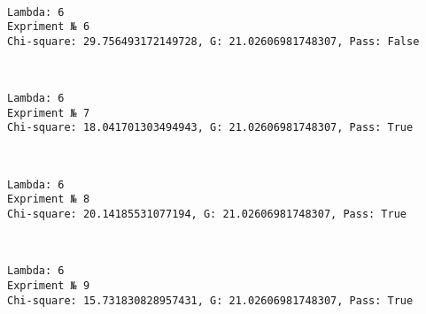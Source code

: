 \documentclass[11pt]{article}
\begin{document}
    \begin{center}
    \end{center}
    { \hspace*{\fill} \\}
    
    \begin{Verbatim}[commandchars=\\\{\}]
Lambda: 6
Expriment № 6
Chi-square: 29.756493172149728, G: 21.02606981748307, Pass: False
    \end{Verbatim}

    \begin{center}
    \end{center}
    { \hspace*{\fill} \\}
    
    \begin{Verbatim}[commandchars=\\\{\}]
Lambda: 6
Expriment № 7
Chi-square: 18.041701303494943, G: 21.02606981748307, Pass: True
    \end{Verbatim}

    \begin{center}
    \end{center}
    { \hspace*{\fill} \\}
    
    \begin{Verbatim}[commandchars=\\\{\}]
Lambda: 6
Expriment № 8
Chi-square: 20.14185531077194, G: 21.02606981748307, Pass: True
    \end{Verbatim}

    \begin{center}
    \end{center}
    { \hspace*{\fill} \\}
    
    \begin{Verbatim}[commandchars=\\\{\}]
Lambda: 6
Expriment № 9
Chi-square: 15.731830828957431, G: 21.02606981748307, Pass: True
    \end{Verbatim}
\end{document}
